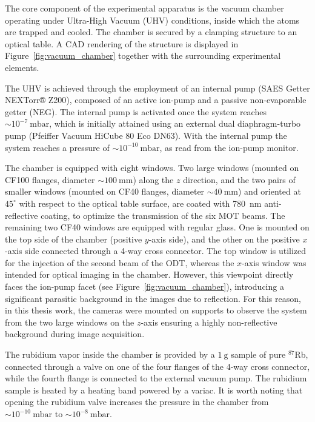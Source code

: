 The core component of the experimental apparatus is the vacuum chamber operating under Ultra-High Vacuum (UHV) conditions, inside which the atoms are trapped and cooled. The chamber is secured by a clamping structure to an optical table. A CAD rendering of the structure is displayed in Figure~\ref{fig:vacuum_chamber} together with the surrounding experimental elements. 

The UHV is achieved through the employment of an internal pump (SAES Getter NEXTorr® Z200), composed of an active ion-pump and a passive non-evaporable getter (NEG). The internal pump is activated once the system reaches $\sim 10^{-7}~\text{mbar}$, which is initially attained using an external dual diaphragm-turbo pump (Pfeiffer Vacuum HiCube 80 Eco DN63). With the internal pump the system reaches a pressure of $\sim 10^{-10}~\text{mbar}$, as read from the ion-pump monitor.

The chamber is equipped with eight windows. Two large windows (mounted on CF100 flanges, diameter $\sim 100~\text{mm}$) along the $z$ direction, and the two pairs of smaller windows (mounted on CF40 flanges, diameter $\sim 40~\text{mm}$) and oriented at $45^\circ$ with respect to the optical table surface, are coated with 780~nm anti-reflective coating, to optimize the transmission of the six MOT beams.
The remaining two CF40 windows are equipped with regular glass. One is mounted on the top side of the chamber (positive $y$-axis side), and the other on the positive $x$-axis side connected through a 4-way cross connector. The top window is utilized for the injection of the second beam of the ODT, whereas the $x$-axis window was intended for optical imaging in the chamber. However, this viewpoint directly faces the ion-pump facet (see Figure~\ref{fig:vacuum_chamber}), introducing a significant parasitic background in the images due to reflection. For this reason, in this thesis work, the cameras were mounted on supports to observe the system from the two large windows on the $z$-axis ensuring a highly non-reflective background during image acquisition.

The rubidium vapor inside the chamber is provided by a $1~\mathrm{g}$ sample of pure $^{87}$Rb, connected through a valve on one of the four flanges of the 4-way cross connector, while the fourth flange is connected to the external vacuum pump. The rubidium sample is heated by a heating band powered by a variac. It is worth noting that opening the rubidium valve increases the pressure in the chamber from $\sim10^{-10}~\text{mbar}$ to $\sim10^{-8}~\text{mbar}$.

